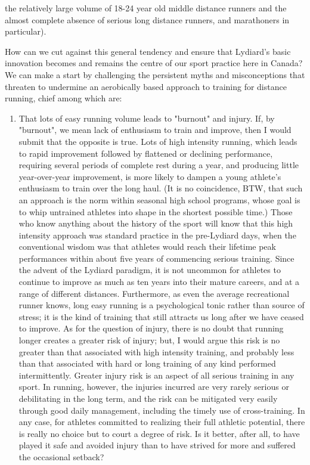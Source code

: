 the relatively large volume of 18-24 year old middle distance runners and the almost complete absence of serious long distance runners, and marathoners in particular).

How can we cut against this general tendency and ensure that Lydiard's basic innovation becomes and remains the centre of our sport practice here in Canada? We can make a start by challenging the persistent myths and misconceptions that threaten to undermine an aerobically based approach to training for distance running, chief among which are:

\begin{enumerate}
    \item That lots of easy running volume leads to "burnout" and injury. If, by "burnout", we mean lack of enthusiasm to train and improve, then I would submit that the opposite is true. Lots of high intensity running, which leads to rapid improvement followed by flattened or declining performance, requiring several periods of complete rest during a year, and producing little year-over-year improvement, is more likely to dampen a young athlete's enthusiasm to train over the long haul. (It is no coincidence, BTW, that such an approach is the norm within seasonal high school programs, whose goal is to whip untrained athletes into shape in the shortest possible time.) Those who know anything about the history of the sport will know that this high intensity approach was standard practice in the pre-Lydiard days, when the conventional wisdom was that athletes would reach their lifetime peak performances within about five years of commencing serious training. Since the advent of the Lydiard paradigm, it is not uncommon for athletes to continue to improve as much as ten years into their mature careers, and at a range of different distances. Furthermore, as even the average recreational runner knows, long easy running is a psychological tonic rather than source of stress; it is the kind of training that still attracts us long after we have ceased to improve. As for the question of injury, there is no doubt that running longer creates a greater risk of injury; but, I would argue this risk is no greater than that associated with high intensity training, and probably less than that associated with hard or long training of any kind performed intermittently. Greater injury risk is an aspect of all serious training in any sport. In running, however, the injuries incurred are very rarely serious or debilitating in the long term, and the risk can be mitigated very easily through good daily management, including the timely use of cross-training. In any case, for athletes committed to realizing their full athletic potential, there is really no choice but to court a degree of risk. Is it better, after all, to have played it safe and avoided injury than to have strived for more and suffered the occasional setback?


\end{enumerate}
